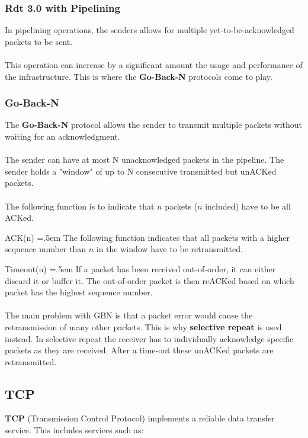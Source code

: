 \documentclass{article}
\newenvironment{cverbatim}
 {\SaveVerbatim{cverb}}
 {\endSaveVerbatim
  \flushleft\fboxrule=0pt\fboxsep=.5em
  \colorbox{cverbbg}{\BUseVerbatim{cverb}}%
  \endflushleft
}
\begin{document}
\subsubsection{Rdt 3.0 with Pipelining}
In pipelining operations, the senders allows for multiple yet-to-be-acknowledged packets to be sent. \\ \\
This operation can increase by a significant amount the usage and performance of the infrastructure. This is where the \textbf{Go-Back-N} protocols come to play.

\subsubsection{Go-Back-N}
The \textbf{Go-Back-N} protocol allows the sender to transmit multiple packets without waiting for an acknowledgment. \\ \\
The sender can have at most N unacknowledged packets in the pipeline. The sender holds a "window" of up to N consecutive transmitted but unACKed packets. \\ \\
The following function is to indicate that $n$ packets ($n$ included) have to be all ACKed.

\begin{cverbatim}
ACK(n)
\end{cverbatim}
The following function indicates that all packets with a higher sequence number than $n$ in the window have to be retransmitted.

\begin{cverbatim}
Timeout(n)
\end{cverbatim}
If a packet has been received out-of-order, it can either discard it or buffer it. The out-of-order packet is then reACKed based on which packet has the highest sequence number. \\ \\
The main problem with GBN is that a packet error would cause the retransmission of many other packets. This is why \textbf{selective repeat} is used instead. In selective repeat the receiver has to individually acknowledge specific packets as they are received. After a time-out these unACKed packets are retransmitted.

\subsection{TCP}
\textbf{TCP} (Transmission Control Protocol) implements a reliable data transfer service. This includes services such as:
\end{document}
